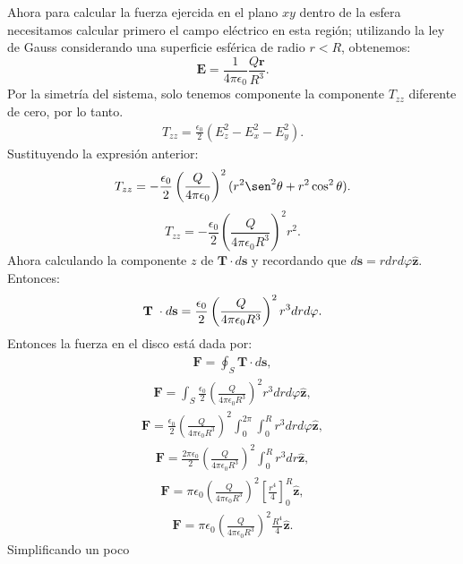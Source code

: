 \documentclass[11pt,fleqn]{book} %
\begin{document}
\begin{example}
\begin{equation}
\end{equation}
Ahora para calcular la fuerza ejercida en el plano $xy$ dentro de la esfera necesitamos calcular primero el campo el\'ectrico en esta regi\'on; utilizando la ley de Gauss considerando una superficie esf\'erica de radio $r<R$, obtenemos:
\begin{equation}
\textbf{E}=\frac{1}{4\pi \epsilon_{0}}\frac{Q \textbf{r}}{R^3}.
\end{equation}
Por la simetr\'ia del sistema, solo tenemos componente la componente $T_{zz}$ diferente de cero, por lo tanto.
\begin{eqnarray*}
T_{zz}=\frac{\epsilon_{0}}{2}(E_{z}^{2}-E_x^2-E_y^2).
\end{eqnarray*}
Sustituyendo la expresi\'on anterior:
\begin{eqnarray*}
T_{zz}=-\frac{\epsilon_{0}}{2}\left(\frac{Q}{4\pi\epsilon_{0}}\right)^{2} (r^{2} \sen^{2} \theta +r^{2} \cos^{2} \theta).
\end{eqnarray*}
\begin{equation}
T_{zz}=-\frac{\epsilon_{0}}{2}\left(\frac{Q}{4\pi\epsilon_{0}R^{3}}\right)^{2}r^{2}.
\end{equation}
Ahora calculando la componente $z$ de $\textbf{T} \cdot d\textbf{s}$ y recordando que $d\textbf{s}=rdrd\varphi\hat{\textbf{z}}$.
Entonces:
\begin{equation}
\textbf{T}\hspace{1mm}\cdot d\textbf{s}=\frac{\epsilon_{0}}{2}\left(\frac{Q}{4\pi\epsilon_{0}R^{3}}\right)^{2}r^{3}drd\varphi.
 \end{equation}
Entonces la fuerza en el disco est\'a dada por:
\begin{eqnarray*}
\textbf{F}=\oint_{S}\textbf{T}\cdot d\textbf{s},
\end{eqnarray*}
\begin{eqnarray*}
\textbf{F}=\int_{S} \frac{\epsilon_{0}}{2}\left(\frac{Q}{4\pi\epsilon_{0}R^{3}}\right)^{2}r^{3}drd\varphi\hat{\textbf{z}},
\end{eqnarray*}
\begin{eqnarray*}
\textbf{F}= \frac{\epsilon_{0}}{2}\left(\frac{Q}{4\pi\epsilon_{0}R^{3}}\right)^{2}\int_{0}^{2\pi}\int_{0}^{R}r^{3}drd\varphi\hat{\textbf{z}},
\end{eqnarray*}
\begin{eqnarray*}
\textbf{F}= \frac{2\pi \epsilon_{0}}{2}\left(\frac{Q}{4\pi\epsilon_{0}R^{3}}\right)^{2}\int_{0}^{R}r^{3}dr\hat{\textbf{z}},
\end{eqnarray*}
\begin{eqnarray*}
\textbf{F}= \pi \epsilon_{0}\left(\frac{Q}{4\pi\epsilon_{0}R^{3}}\right)^{2}\left[ \frac{r^{4}}{4} \right] _{0}^{R}\hat{\textbf{z}},
\end{eqnarray*}
\begin{eqnarray*}
\textbf{F}= \pi \epsilon_{0}\left(\frac{Q}{4\pi\epsilon_{0}R^{3}}\right)^{2} \frac{R^{4}}{4} \hat{\textbf{z}}.
\end{eqnarray*}
Simplificando un poco


\end{example}
\end{document}
